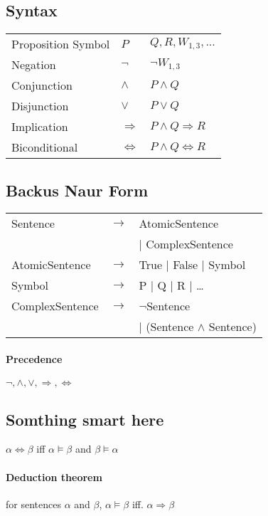\begin{multicols}{4}
\subsection{Syntax}
\begin{tabular}{l l l}
Proposition Symbol	& $P$				& $Q, R, W_{1,3}, ...$ \\
Negation			& $\lnot$			& $\lnot W_{1,3}$ \\
Conjunction			& $\wedge$			& $P \wedge Q$ \\
Disjunction			& $\lor$			& $P \lor Q$ \\
Implication			& $\Rightarrow$		& $P \wedge Q \Rightarrow R$ \\
Biconditional		& $\Leftrightarrow$	& $P \wedge Q \Leftrightarrow R$ \\
\end{tabular}

\subsection{Backus Naur Form}
\begin{tabular}{l c l}
Sentence		& $\rightarrow$	& AtomicSentence \\
				&				& | ComplexSentence \\
AtomicSentence	& $\rightarrow$	& True | False | Symbol \\
Symbol			& $\rightarrow$	& P | Q | R | \dots \\
ComplexSentence & $\rightarrow$	& $\lnot$Sentence \\
				&				& | (Sentence $\land$ Sentence) \\
\end{tabular}
\paragraph{Precedence} $\lnot, \land, \lor, \Rightarrow, \Leftrightarrow$

\subsection{Somthing smart here}

$\alpha \Leftrightarrow \beta$ iff $\alpha \models \beta$ and $\beta \models \alpha$

\paragraph{Deduction theorem} for sentences $\alpha$ and $\beta$, $\alpha \models \beta$ iff. $\alpha \Rightarrow \beta$

\end{multicols}
